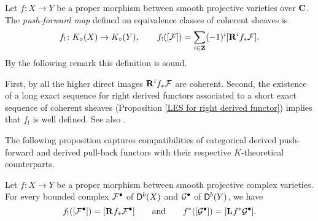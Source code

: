 \begin{definition}
    Let $f \colon X \to Y$ be a proper morphism between smooth projective varieties over $\mathbf C$. 
    The \emph{push-forward map} defined on equivalence classes of coherent sheaves is
    \[
        f_! \colon K_{\circ}(X) \to K_{\circ}(Y), \qquad f_!([\mathcal F]) = \sum_{i \in \mathbf Z}(-1)^i[\mathbf{R}^{i}f_*\mathcal F].
    \]
    By the following remark this definition is sound.
\end{definition}

\begin{remark}
    First, by \cite[\S III.3.2, Theorem 3.2.1]{EGA} all the higher direct images $\mathbf{R}^{i}f_*\mathcal F$ are coherent.
    Second, the existence of a long exact sequence for right derived functors associated to a short exact sequence of coherent sheaves (Proposition \ref{LES for right derived functor}) implies that $f_!$ is well defined. See also \cite[\S II, Lemma 6.2.6]{Weibel2013}.
\end{remark}

The following proposition captures compatibilities of categorical derived push-forward and derived pull-back functors with their respective $K$-theoretical counterparts.  

\begin{proposition}
    \label{push-forward and pull-back compatibilities}
    \emph{\cite[\S 5.2]{huybrechts2006fouriermukai}}
    Let $f \colon X \to Y$ be a proper morphism between smooth projective complex varieties. For every bounded complex $\mathcal F^\bullet$ of $\mathsf{D}^b(X)$ and $\mathcal G^\bullet$ of $\mathsf{D}^b(Y)$, we have
    \[
        f_!([\mathcal F^\bullet]) = [\mathbf{R}^{}f_*\mathcal F^\bullet] \qquad \text{and} \qquad f^*([\mathcal G^\bullet]) = [\mathbf{L}^{}f^*\mathcal G^\bullet].
    \]
\end{proposition}

